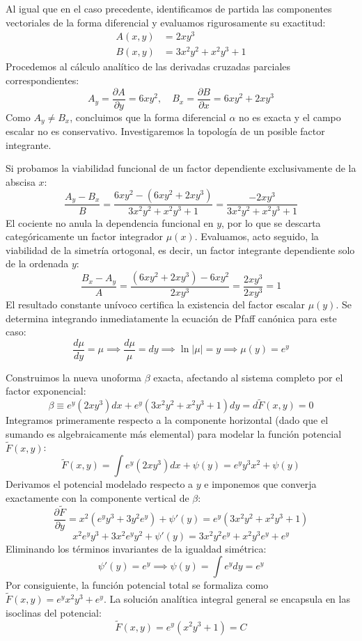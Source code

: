 \documentclass[11pt,a4paper]{article}
\theoremstyle{definition}
\theoremstyle{plain}
\begin{document}
\begin{tcolorbox}
Al igual que en el caso precedente, identificamos de partida las componentes vectoriales de la forma diferencial y evaluamos rigurosamente su exactitud:
\begin{align*}
    A(x,y) &= 2xy^3 \\
    B(x,y) &= 3x^2y^2 + x^2y^3 + 1 
\end{align*}
Procedemos al cálculo analítico de las derivadas cruzadas parciales correspondientes:
$$ A_y = \frac{\partial A}{\partial y} = 6xy^2, \quad B_x = \frac{\partial B}{\partial x} = 6xy^2 + 2xy^3 $$
Como $A_y \neq B_x$, concluimos que la forma diferencial $\alpha$ no es exacta y el campo escalar no es conservativo. Investigaremos la topología de un posible factor integrante.

Si probamos la viabilidad funcional de un factor dependiente exclusivamente de la abscisa $x$:
$$ \frac{A_y - B_x}{B} = \frac{6xy^2 - (6xy^2 + 2xy^3)}{3x^2y^2 + x^2y^3 + 1} = \frac{-2xy^3}{3x^2y^2 + x^2y^3 + 1} $$
El cociente no anula la dependencia funcional en $y$, por lo que se descarta categóricamente un factor integrador $\mu(x)$. Evaluamos, acto seguido, la viabilidad de la simetría ortogonal, es decir, un factor integrante dependiente solo de la ordenada $y$:
$$ \frac{B_x - A_y}{A} = \frac{(6xy^2 + 2xy^3) - 6xy^2}{2xy^3} = \frac{2xy^3}{2xy^3} = 1 $$
El resultado constante unívoco certifica la existencia del factor escalar $\mu(y)$. Se determina integrando inmediatamente la ecuación de Pfaff canónica para este caso:
$$ \frac{d\mu}{dy} = \mu \implies \frac{d\mu}{\mu} = dy \implies \ln|\mu| = y \implies \mu(y) = e^y $$

Construimos la nueva unoforma $\beta$ exacta, afectando al sistema completo por el factor exponencial:
$$ \beta \equiv e^y(2xy^3)dx + e^y(3x^2y^2 + x^2y^3 + 1)dy = d\tilde{F}(x,y) = 0 $$
Integramos primeramente respecto a la componente horizontal (dado que el sumando es algebraicamente más elemental) para modelar la función potencial $\tilde{F}(x,y)$:
$$ \tilde{F}(x,y) = \int e^y(2xy^3)dx + \psi(y) = e^y y^3 x^2 + \psi(y) $$
Derivamos el potencial modelado respecto a $y$ e imponemos que converja exactamente con la componente vertical de $\beta$:
$$ \frac{\partial \tilde{F}}{\partial y} = x^2(e^y y^3 + 3y^2e^y) + \psi'(y) = e^y(3x^2y^2 + x^2y^3 + 1) $$
$$ x^2e^yy^3 + 3x^2e^yy^2 + \psi'(y) = 3x^2y^2e^y + x^2y^3e^y + e^y $$
Eliminando los términos invariantes de la igualdad simétrica:
$$ \psi'(y) = e^y \implies \psi(y) = \int e^y dy = e^y $$
Por consiguiente, la función potencial total se formaliza como $\tilde{F}(x,y) = e^y x^2 y^3 + e^y$.
La solución analítica integral general se encapsula en las isoclinas del potencial:
$$ \tilde{F}(x,y) = e^y(x^2y^3 + 1) = C $$


\end{tcolorbox}
\end{document}
